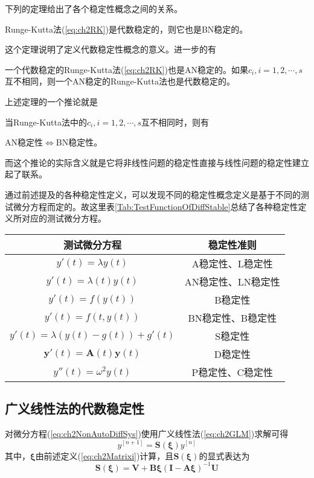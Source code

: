 下列的定理给出了各个稳定性概念之间的关系。
\begin{theorem}
Runge-Kutta法(\ref{eq:ch2RK})是代数稳定的，则它也是BN稳定的。
\end{theorem}
这个定理说明了定义代数稳定性概念的意义。进一步的有
\begin{theorem}
一个代数稳定的Runge-Kutta法(\ref{eq:ch2RK})也是AN稳定的。如果$c_i,i=1,2,\cdots,s$互不相同，则一个AN稳定的Runge-Kutta法也是代数稳定的。
\end{theorem}

上述定理的一个推论就是
\begin{corollary}
当Runge-Kutta法中的$c_i,i=1,2,\cdots,s$互不相同时，则有

AN稳定性$\iff$BN稳定性。
\end{corollary}
而这个推论的实际含义就是它将非线性问题的稳定性直接与线性问题的稳定性建立起了联系。

通过前述提及的各种稳定性定义，可以发现不同的稳定性概念定义是基于不同的测试微分方程而定的。故这里表\ref{Tab:TestFunctionOfDiffStable}总结了各种稳定性定义所对应的测试微分方程。\vspace{-10pt}
\begin{table}[htbp]
\vspace{0.5em}\centering\wuhao
\begin{tabular}{cc}
\toprule[1.5pt]
测试微分方程 & 稳定性准则\\
\midrule[1pt]
$y'(t)=\lambda y(t)$ & A稳定性、L稳定性\\
$y'(t)=\lambda(t) y(t)$ & AN稳定性、LN稳定性\\
$y'(t)=f(y(t))$ & B稳定性\\
$y'(t)=f(t,y(t))$ & BN稳定性、B稳定性\\
$y'(t)=\lambda(y(t)-g(t))+g'(t)$ & S稳定性\\
$\bm{y}'(t)=\bm{A}(t)\bm{y}(t)$ & D稳定性\\
$y''(t)=\omega^2y(t)$ & P稳定性、C稳定性\\
\bottomrule[1.5pt]
\end{tabular}
\end{table}
\subsection{广义线性法的代数稳定性}
对微分方程(\ref{eq:ch2NonAutoDiffSys})使用广义线性法(\ref{eq:ch2GLM})求解可得
\begin{equation}
y^{[n+1]}=\bm{S}(\bm{\xi})y^{[n]}
\end{equation}
其中，$\bm{\xi}$由前述定义(\ref{eq:ch2Matrixi})计算，且$\bm{S}(\bm{\xi})$的显式表达为\begin{equation}
\bm{S}(\bm{\xi})=\bm{V}+\bm{B\xi}(\bm{I}-\bm{A\xi})^{-1}\bm{U}
\end{equation}

